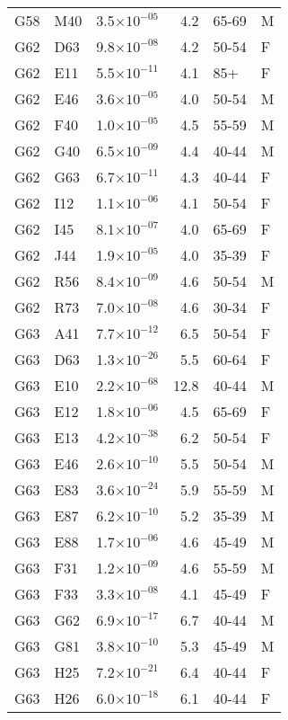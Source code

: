 \begin{longtable}{lllrll}
   G58 & M40 & 3.5$\times10^{-05}$ & 4.2 & 65-69 & M \\ 
   G62 & D63 & 9.8$\times10^{-08}$ & 4.2 & 50-54 & F \\ 
   G62 & E11 & 5.5$\times10^{-11}$ & 4.1 & 85+ & F \\ 
   G62 & E46 & 3.6$\times10^{-05}$ & 4.0 & 50-54 & M \\ 
   G62 & F40 & 1.0$\times10^{-05}$ & 4.5 & 55-59 & M \\ 
   G62 & G40 & 6.5$\times10^{-09}$ & 4.4 & 40-44 & M \\ 
   G62 & G63 & 6.7$\times10^{-11}$ & 4.3 & 40-44 & F \\ 
   G62 & I12 & 1.1$\times10^{-06}$ & 4.1 & 50-54 & F \\ 
   G62 & I45 & 8.1$\times10^{-07}$ & 4.0 & 65-69 & F \\ 
   G62 & J44 & 1.9$\times10^{-05}$ & 4.0 & 35-39 & F \\ 
   G62 & R56 & 8.4$\times10^{-09}$ & 4.6 & 50-54 & M \\ 
   G62 & R73 & 7.0$\times10^{-08}$ & 4.6 & 30-34 & F \\ 
   G63 & A41 & 7.7$\times10^{-12}$ & 6.5 & 50-54 & F \\ 
   G63 & D63 & 1.3$\times10^{-26}$ & 5.5 & 60-64 & F \\ 
   G63 & E10 & 2.2$\times10^{-68}$ & 12.8 & 40-44 & M \\ 
   G63 & E12 & 1.8$\times10^{-06}$ & 4.5 & 65-69 & F \\ 
   G63 & E13 & 4.2$\times10^{-38}$ & 6.2 & 50-54 & F \\ 
   G63 & E46 & 2.6$\times10^{-10}$ & 5.5 & 50-54 & M \\ 
   G63 & E83 & 3.6$\times10^{-24}$ & 5.9 & 55-59 & M \\ 
   G63 & E87 & 6.2$\times10^{-10}$ & 5.2 & 35-39 & M \\ 
   G63 & E88 & 1.7$\times10^{-06}$ & 4.6 & 45-49 & M \\ 
   G63 & F31 & 1.2$\times10^{-09}$ & 4.6 & 55-59 & M \\ 
   G63 & F33 & 3.3$\times10^{-08}$ & 4.1 & 45-49 & F \\ 
   G63 & G62 & 6.9$\times10^{-17}$ & 6.7 & 40-44 & M \\ 
   G63 & G81 & 3.8$\times10^{-10}$ & 5.3 & 45-49 & M \\ 
   G63 & H25 & 7.2$\times10^{-21}$ & 6.4 & 40-44 & F \\ 
   G63 & H26 & 6.0$\times10^{-18}$ & 6.1 & 40-44 & F \\ 

\end{longtable}
